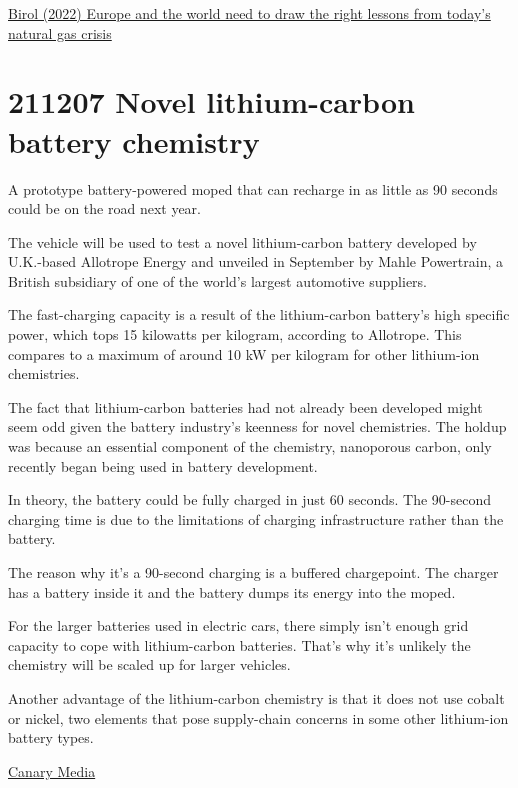 \documentclass[
]{book}
\begin{document}
\href{https://www.linkedin.com/pulse/europe-world-need-draw-right-lessons-from-todays-natural-fatih-birol/}{Birol (2022) Europe and the world need to draw the right lessons from today's natural gas crisis}

\hypertarget{novel-lithium-carbon-battery-chemistry}{%
\section{211207 Novel lithium-carbon battery chemistry}\label{novel-lithium-carbon-battery-chemistry}}

A prototype battery-powered moped that can recharge in as little as 90 seconds could be on the road next year.

The vehicle will be used to test a novel lithium-carbon battery developed by U.K.-based Allotrope Energy and unveiled in September by Mahle Powertrain, a British subsidiary of one of the world's largest automotive suppliers.

The fast-charging capacity is a result of the lithium-carbon battery's high specific power, which tops 15 kilowatts per kilogram, according to Allotrope. This compares to a maximum of around 10 kW per kilogram for other lithium-ion chemistries.

The fact that lithium-carbon batteries had not already been developed might seem odd given the battery industry's keenness for novel chemistries. The holdup was because an essential component of the chemistry, nanoporous carbon, only recently began being used in battery development.

In theory, the battery could be fully charged in just 60 seconds. The 90-second charging time is due to the limitations of charging infrastructure rather than the battery.

The reason why it's a 90-second charging is a buffered chargepoint. The charger has a battery inside it and the battery dumps its energy into the moped.

For the larger batteries used in electric cars, there simply isn't enough grid capacity to cope with lithium-carbon batteries. That's why it's unlikely the chemistry will be scaled up for larger vehicles.

Another advantage of the lithium-carbon chemistry is that it does not use cobalt or nickel, two elements that pose supply-chain concerns in some other lithium-ion battery types.

\href{https://www.canarymedia.com/articles/electric-vehicles/prototype-of-electric-moped-with-90-second-charge-time-set-to-hit-the-streets-in-2022}{Canary Media}
\end{document}

